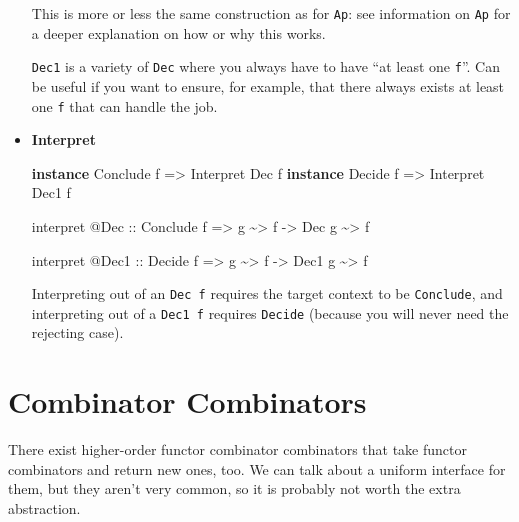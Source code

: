 \documentclass[]{article}
\newenvironment{Shaded}{}{}
\newcommand{\DataTypeTok}[1]{\textcolor[rgb]{0.56,0.13,0.00}{#1}}
\newcommand{\KeywordTok}[1]{\textcolor[rgb]{0.00,0.44,0.13}{\textbf{#1}}}
\newcommand{\NormalTok}[1]{#1}
\newcommand{\OperatorTok}[1]{\textcolor[rgb]{0.40,0.40,0.40}{#1}}
\newcommand{\OtherTok}[1]{\textcolor[rgb]{0.00,0.44,0.13}{#1}}
\begin{document}
\begin{itemize}
  This is more or less the same construction as for \texttt{Ap}: see information
  on \texttt{Ap} for a deeper explanation on how or why this works.

  \texttt{Dec1} is a variety of \texttt{Dec} where you always have to have ``at
  least one \texttt{f}''. Can be useful if you want to ensure, for example, that
  there always exists at least one \texttt{f} that can handle the job.
\item
  \textbf{Interpret}

\begin{Shaded}
\begin{Highlighting}[]
\KeywordTok{instance} \DataTypeTok{Conclude}\NormalTok{ f }\OtherTok{=>} \DataTypeTok{Interpret} \DataTypeTok{Dec}\NormalTok{  f}
\KeywordTok{instance} \DataTypeTok{Decide}\NormalTok{   f }\OtherTok{=>} \DataTypeTok{Interpret} \DataTypeTok{Dec1}\NormalTok{ f}

\NormalTok{interpret }\OperatorTok{@}\DataTypeTok{Dec}
\OtherTok{    ::} \DataTypeTok{Conclude}\NormalTok{ f}
    \OtherTok{=>}\NormalTok{ g }\OperatorTok{\textasciitilde{}>}\NormalTok{ f}
    \OtherTok{{-}>} \DataTypeTok{Dec}\NormalTok{ g }\OperatorTok{\textasciitilde{}>}\NormalTok{ f}

\NormalTok{interpret }\OperatorTok{@}\DataTypeTok{Dec1}
\OtherTok{    ::} \DataTypeTok{Decide}\NormalTok{ f}
    \OtherTok{=>}\NormalTok{ g }\OperatorTok{\textasciitilde{}>}\NormalTok{ f}
    \OtherTok{{-}>} \DataTypeTok{Dec1}\NormalTok{ g }\OperatorTok{\textasciitilde{}>}\NormalTok{ f}
\end{Highlighting}
\end{Shaded}

  Interpreting out of an \texttt{Dec\ f} requires the target context to be
  \texttt{Conclude}, and interpreting out of a \texttt{Dec1\ f} requires
  \texttt{Decide} (because you will never need the rejecting case).
\end{itemize}

\hypertarget{combinator-combinators}{%
\section{Combinator Combinators}\label{combinator-combinators}}

There exist higher-order functor combinator combinators that take functor
combinators and return new ones, too. We can talk about a uniform interface for
them, but they aren't very common, so it is probably not worth the extra
abstraction.
\end{document}
